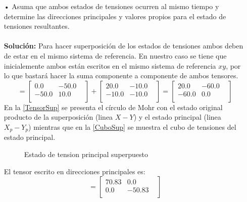 \documentclass[../notas medios.tex]{subfiles}
\begin{document}
\begin{enumerate}
%
\item[•] Asuma que ambos estados de tensiones ocurren al mismo tiempo y determine
las direcciones principales y valores propios para el estado de tensiones
resultantes. \\\\
%
\textbf{Solución:}
%
Para hacer superposición de los estados de tensiones ambos deben de estar en el
mismo sistema de referencia. En nuestro caso se tiene que inicialemente ambos
están escritos en el mismo sistema de referencia $x y$, por lo que bastará hacer
la suma componente a componente de ambos tensores.
\begin{equation}
[\sigma_t] =
 	\begin{bmatrix}
     	0.0 & -50.0 &  \\
     	-50.0 & 10.0 \\
 	\end{bmatrix}
	+
 	\begin{bmatrix}
     	20.0 & -10.0 &  \\
     	-10.0 & -10.0 \\
 	\end{bmatrix}
 	=
 	\begin{bmatrix}
     	20.0 & -60.0 &  \\
     	-60.0 & 0.0 \\
 	\end{bmatrix}
\end{equation}
%
En la  \cref{TensorSup} se presenta el círculo de Mohr
con el estado original producto de la superposición (linea $X -Y$) y el estado
principal (linea $X_p - Y_p$) mientras que en la \cref{CuboSup} se muestra
el cubo de tensiones del estado principal.
%
\begin{figure}[H]
	\centering
		\hspace{0.5cm}
	\caption{Estado de tension principal superpuesto }
	\label{TensSupPrin}
\end{figure}
%
El tensor escrito en direcciones principales es: 
\begin{equation}
 [\sigma^p_{2}] =
 	\begin{bmatrix}
     	70.83 & 0.0 &  \\
     	0.0 & -50.83 \\
 	\end{bmatrix}
\end{equation}

\end{enumerate}
\end{document}
